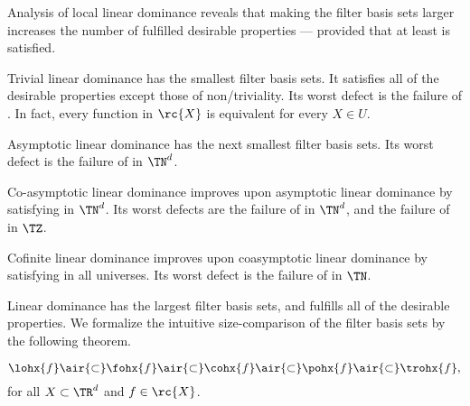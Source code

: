 \documentclass[b5paper, english, oneside]{memoir}
\begin{document}
Analysis of local linear dominance reveals that making the filter basis sets larger increases the number of fulfilled desirable properties --- provided that at least  is satisfied. 

Trivial linear dominance has the smallest filter basis sets. It satisfies all of the desirable properties except those of non\-/triviality. Its worst defect is the failure of . In fact, every function in $\rc{X}$ is equivalent for every $X \in U$. 

Asymptotic linear dominance has the next smallest filter basis sets. Its worst defect is the failure of  in $\TN^d$. 

Co-asymptotic linear dominance improves upon asymptotic linear dominance by satisfying  in $\TN^d$. Its worst defects are the failure of  in $\TN^d$, and the failure of  in $\TZ$. 

Cofinite linear dominance improves upon coasymptotic linear dominance by satisfying  in all universes. Its worst defect is the failure of  in $\TN$.

Linear dominance has the largest filter basis sets, and fulfills all of the desirable properties. We formalize the intuitive size-comparison of the filter basis sets by the following theorem.

\begin{theorem}[Containment in $\TR^d$]
\label{Containment}
\begin{equation}
\lohx{f} \air{\subset} \fohx{f} \air{\subset} \cohx{f} \air{\subset} \pohx{f} \air{\subset} \trohx{f},
\end{equation}
for all $X \subset \TR^d$ and $f \in \rc{X}$.
\end{theorem}
\end{document}

